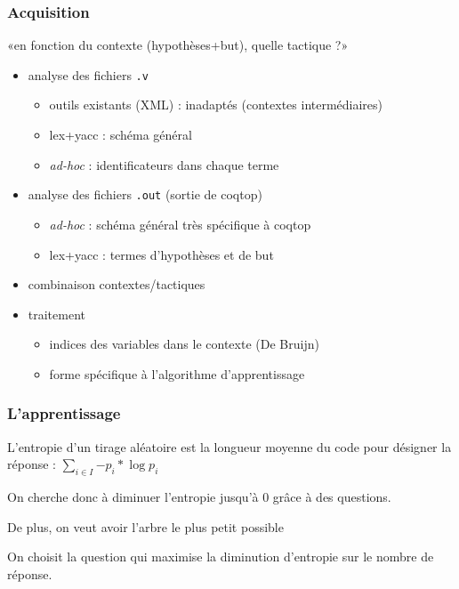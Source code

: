 \begin{frame}
  \frametitle{Acquisition}
  «en fonction du contexte (hypothèses+but), quelle tactique ?»
  \begin{itemize}
    \item analyse des fichiers {\tt .v}
      \begin{itemize}
        \item outils existants (XML) : inadaptés (contextes intermédiaires)
        \item lex+yacc : schéma général
        \item \textit{ad-hoc} : identificateurs dans chaque terme
      \end{itemize}
    \item analyse des fichiers {\tt .out} (sortie de coqtop) 
      \begin{itemize}
        \item \textit{ad-hoc} : schéma général très spécifique à coqtop
        \item lex+yacc : termes d'hypothèses et de but
      \end{itemize}
    \item combinaison contextes/tactiques
    \item traitement
      \begin{itemize}
        \item indices des variables dans le contexte (De Bruijn)
        \item forme spécifique à l'algorithme d'apprentissage
      \end{itemize}
  \end{itemize}
\end{frame}



\begin{frame}
\frametitle{L'apprentissage}
  \begin{definition}[entropie]
    L'entropie d'un tirage aléatoire est la longueur moyenne du code pour désigner la réponse : $\sum_{i \in I}{-p_i*\log{p_i}}$
  \end{definition}

  On cherche donc à diminuer l'entropie jusqu'à 0 grâce à des questions. 
 
  De plus, on veut avoir l'arbre le plus petit possible

  On choisit la question qui maximise la diminution d'entropie sur le nombre de réponse.

\end{frame}

